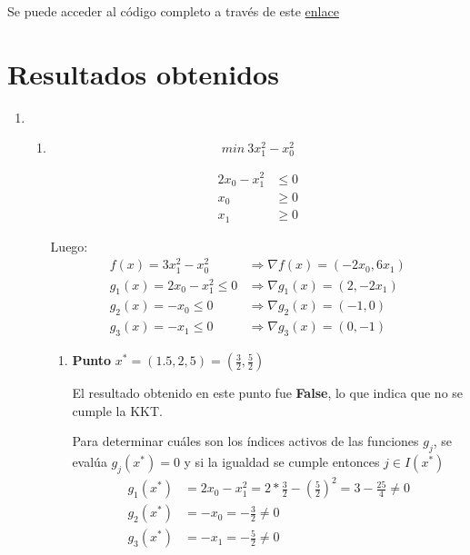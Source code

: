 \documentclass[titlepage, 11pt]{scrartcl}
\begin{document}
Se puede acceder al código completo a través de este \href{utils.py}{enlace}
	
	
	\vspace{1cm}
	\section{Resultados obtenidos}

\begin{enumerate}
	\item 
	\begin{enumerate}
		\item \begin{equation*}
		min \ 3x_1^2 - x_0^2
		\end{equation*}
		
		\begin{align*}
		2x_0 - x_1^2 &\leq 0\\
		x_0 &\geq 0\\
		x_1 &\geq 0
		\end{align*}
		
		Luego:
		\begin{align*}
		f(x) = 3x_1^2 - x_0^2 &\Rightarrow \nabla f(x) = (-2x_0, 6x_1)\\
		g_1(x) = 2x_0 - x_1^2 \leq 0 &\Rightarrow \nabla g_1(x) = (2, -2x_1)\\
		g_2(x) = -x_0 \leq 0 &\Rightarrow \nabla g_2(x) = (-1, 0)\\
		g_3(x) =  -x_1 \leq 0 &\Rightarrow \nabla g_3(x) = (0, -1)
		\end{align*}
		
		\vspace{7mm}
		\begin{enumerate}
			\item \textbf{Punto} $x^* = (1.5, 2,5) = (\frac{3}{2}, \frac{5}{2})$
			
			El resultado obtenido en este punto fue \textbf{False}, lo que indica que no se cumple la KKT.
			
			Para determinar cuáles son los \'indices activos de las funciones $g_j$, se eval\'ua  $g_j(x^*) = 0$ y si la igualdad se cumple entonces $j \in I(x^*)$
			\begin{align*}
			g_1(x^*) &= 2x_0 - x_1^2 = 2 * \frac{3}{2} - (\frac{5}{2})^2 = 3 - \frac{25}{4} \neq 0\\
			g_2(x^*) &= -x_0 = - \frac{3}{2} \neq 0\\
			g_3(x^*) &= -x_1 = - \frac{5}{2} \neq 0
			\end{align*}
			

\end{enumerate}
\end{enumerate}
\end{enumerate}
\end{document}

